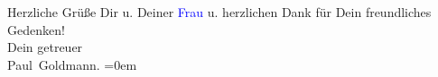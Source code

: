 \pstart
           Herzliche Grüße Dir u. Deiner \textcolor{blue}{Frau}{}\ledrightnote{{$\rightarrow$}\textcolor{blue}{Olga Schnitzler}} u. herzlichen Dank für Dein freundliches Gedenken! {\\[\baselineskip]}Dein getreuer {\\[\baselineskip]}\spacefill\mbox{Paul Goldmann.}\pend
           \leftskip=0em{}\endnumbering{}  
      